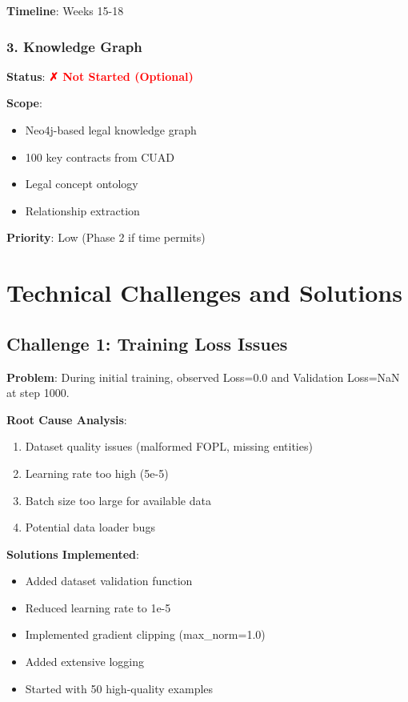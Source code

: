 \documentclass[12pt,a4paper]{article}
\begin{document}
\textbf{Timeline}: Weeks 15-18

\subsubsection{3. Knowledge Graph}

\textbf{Status}: \textcolor{red}{\textbf{✗ Not Started (Optional)}}

\textbf{Scope}:
\begin{itemize}
    \item Neo4j-based legal knowledge graph
    \item 100 key contracts from CUAD
    \item Legal concept ontology
    \item Relationship extraction
\end{itemize}

\textbf{Priority}: Low (Phase 2 if time permits)

\newpage

\section{Technical Challenges and Solutions}

\subsection{Challenge 1: Training Loss Issues}

\textbf{Problem}: During initial training, observed Loss=0.0 and Validation Loss=NaN at step 1000.

\textbf{Root Cause Analysis}:
\begin{enumerate}
    \item Dataset quality issues (malformed FOPL, missing entities)
    \item Learning rate too high (5e-5)
    \item Batch size too large for available data
    \item Potential data loader bugs
\end{enumerate}

\textbf{Solutions Implemented}:
\begin{itemize}
    \item Added dataset validation function
    \item Reduced learning rate to 1e-5
    \item Implemented gradient clipping (max\_norm=1.0)
    \item Added extensive logging
    \item Started with 50 high-quality examples
\end{itemize}
\end{document}
